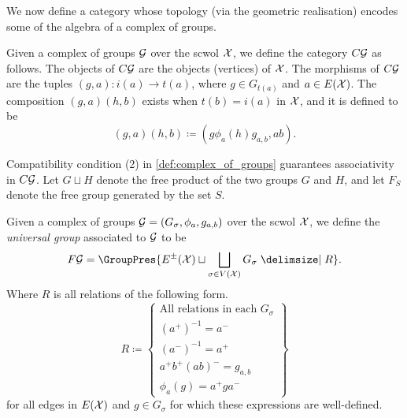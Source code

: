 We now define a category whose topology (via the geometric realisation) encodes some of the algebra of a complex of groups.
\begin{definition}
	Given a complex of groups $\mathcal{G}$ over the scwol  $\mathcal{X}$, we define the category $C\mathcal{G}$ as follows.
	The objects of  $C\mathcal{G}$ are the objects (vertices) of $\mathcal{X}$.
	The morphisms of $C\mathcal{G}$ are the tuples $(g,a) \colon i(a) \to t(a)$, where  $g \in G_{t(a)}$ and  $a \in E(\mathcal{X})$.
	The composition  $(g,a)(h,b)$ exists when  $t(b) = i(a)$ in  $\mathcal{X}$, and it is defined to be
	\[
		(g,a)(h,b) \coloneq (g\phi_a(h)g_{a,b}, ab)
		.\]
\end{definition}
Compatibility condition (2) in \cref{def:complex_of_groups} guarantees associativity in  $C\mathcal{G}$.
Let $G \sqcup H$ denote the free product of the two groups $G$ and $H$, and let $F_S$ denote the free group generated by the set $S$.
\begin{definition}
	Given a complex of groups $\mathcal{G} = (G_\sigma, \phi_a, g_{a,b})$ over the scwol $\mathcal{X}$, we define the \emph{universal group} associated to $\mathcal{G}$ to be
	\[
		F\calg =  \GroupPres{E^\pm(\calx) \sqcup \bigsqcup_{\sigma \in V(\calx)} G_\sigma \relations R}
		.\]
	Where $R$ is all relations of the following form.
	\[
		R \coloneq \left\{
		\begin{array}{l}
			\text{All relations in each }G_\sigma \\
			(a^+)^{-1}   = a^-                    \\
			(a^-)^{-1}   = a^+                    \\
			a^+b^+(ab)^- = g_{a,b}                \\
			\phi_a(g)    = a^+ga^-
		\end{array}
		\right\}
	\]
	for all edges in $E(\mathcal{X})$ and $g \in G_\sigma$ for which these expressions are well-defined.
\end{definition}
